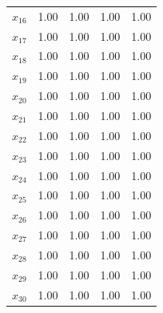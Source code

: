 \documentclass[conference]{IEEEtran}
\begin{document}
\begin{table}[H]
\begin{tabular}{lrrrr}
$x_{16}$ &     1.00 &     1.00 &     1.00 &     1.00 \\
$x_{17}$ &     1.00 &     1.00 &     1.00 &     1.00 \\
$x_{18}$ &     1.00 &     1.00 &     1.00 &     1.00 \\
$x_{19}$ &     1.00 &     1.00 &     1.00 &     1.00 \\
$x_{20}$ &     1.00 &     1.00 &     1.00 &     1.00 \\
$x_{21}$ &     1.00 &     1.00 &     1.00 &     1.00 \\
$x_{22}$ &     1.00 &     1.00 &     1.00 &     1.00 \\
$x_{23}$ &     1.00 &     1.00 &     1.00 &     1.00 \\
$x_{24}$ &     1.00 &     1.00 &     1.00 &     1.00 \\
$x_{25}$ &     1.00 &     1.00 &     1.00 &     1.00 \\
$x_{26}$ &     1.00 &     1.00 &     1.00 &     1.00 \\
$x_{27}$ &     1.00 &     1.00 &     1.00 &     1.00 \\
$x_{28}$ &     1.00 &     1.00 &     1.00 &     1.00 \\
$x_{29}$ &     1.00 &     1.00 &     1.00 &     1.00 \\
$x_{30}$ &     1.00 &     1.00 &     1.00 &     1.00 \\
\bottomrule
\end{tabular}
\end{table}
\end{document}
